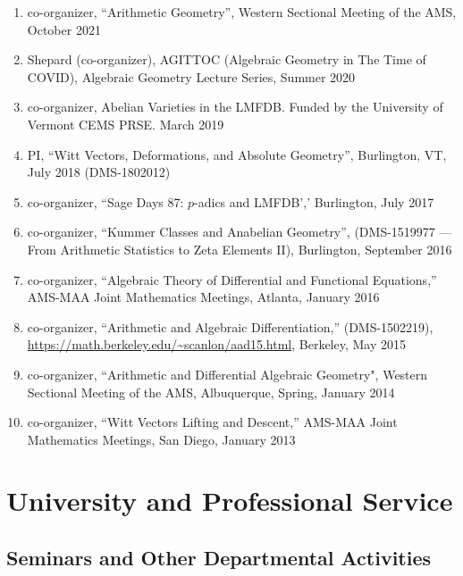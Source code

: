 \documentclass[a4paper,10pt]{article}
\begin{document}
\begin{enumerate} %
	\item co-organizer, ``Arithmetic Geometry'', Western Sectional Meeting of the AMS, October 2021
	\item Shepard (co-organizer), AGITTOC (Algebraic Geometry in The Time of COVID), Algebraic Geometry Lecture Series, Summer 2020  
	\item co-organizer, Abelian Varieties in the LMFDB. Funded by the University of Vermont CEMS PRSE. March 2019
	\item PI, ``Witt Vectors, Deformations, and Absolute Geometry'', Burlington, VT, July 2018 (DMS-1802012)
	\item co-organizer, ``Sage Days 87: $p$-adics and LMFDB',' Burlington, July 2017
	\item co-organizer, ``Kummer Classes and Anabelian Geometry'', (DMS-1519977 --- From Arithmetic Statistics to Zeta Elements II), Burlington, September 2016
	\item co-organizer, ``Algebraic Theory of Differential and Functional Equations,''  AMS-MAA Joint Mathematics Meetings, Atlanta, January 2016
	\item co-organizer, ``Arithmetic and Algebraic Differentiation,'' (DMS-1502219), \url{https://math.berkeley.edu/~scanlon/aad15.html}, Berkeley, May 2015 
	\item co-organizer, ``Arithmetic and Differential Algebraic Geometry", Western Sectional Meeting of the AMS, Albuquerque, Spring, January 2014
	\item co-organizer, ``Witt Vectors Lifting and Descent,'' AMS-MAA Joint Mathematics Meetings, San Diego, January 2013
\end{enumerate}

\section*{University and Professional Service}
\subsection*{Seminars and Other Departmental Activities}
\end{document}
